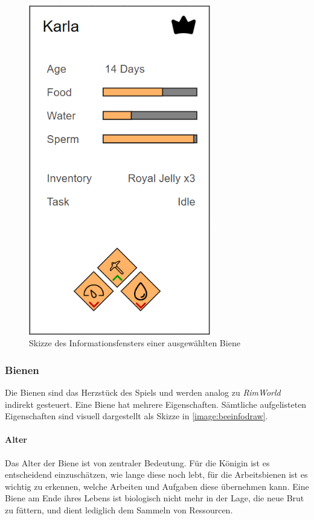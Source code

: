 \begin{figure}
    \begin{center}
        \includegraphics[width=300px]{0.bilder/beeinfodraw.PNG}
    \end{center}
    \caption{Skizze des Informationsfensters einer ausgewählten Biene} \label{image:beeinfodraw}
\end{figure}

\subsubsection{Bienen}
Die Bienen sind das Herzstück des Spiels und werden analog zu \textit{RimWorld} indirekt gesteuert. Eine Biene hat mehrere Eigenschaften. Sämtliche aufgelisteten Eigenschaften sind visuell dargestellt als Skizze in \autoref{image:beeinfodraw}.

\paragraph{Alter} 
Das Alter der Biene ist von zentraler Bedeutung. Für die Königin ist es entscheidend einzuschätzen, wie lange diese noch lebt, für die Arbeitsbienen ist es wichtig zu erkennen, welche Arbeiten und Aufgaben diese übernehmen kann. Eine Biene am Ende ihres Lebens ist biologisch nicht mehr in der Lage, die neue Brut zu füttern, und dient lediglich dem Sammeln von Ressourcen.

